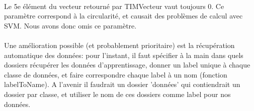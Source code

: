 \documentclass{article}
\begin{document}
\paragraph{}
Le 5e élément du vecteur retourné par TIMVecteur vaut toujours 0. Ce paramètre correspond à la circularité, et causait des problèmes de calcul avec SVM. Nous avons donc omis ce paramètre.

\paragraph{}
Une amélioration possible (et probablement prioritaire) est la récupération automatique des données: pour l'instant, il faut spécifier à la main dans quels dossiers récupérer les données d'apprentissage, donner un label unique à chaque classe de données, et faire correspondre chaque label à un nom (fonction labelToName).
\smallbreak
A l'avenir il faudrait un dossier 'données' qui contiendrait un dossier par classe, et utiliser le nom de ces dossiers comme label pour nos données.
\end{document}
